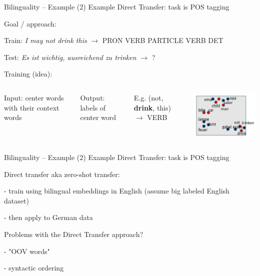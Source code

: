 \documentclass[12pt]{beamer}
\begin{document}
\begin{frame}{Bilinguality -- Example}
(2) Example Direct Transfer: task is POS tagging
	
Goal / approach: 

Train: \emph{I may not drink this} $\to$ PRON VERB PARTICLE VERB DET

Test: \emph{Es ist wichtig, ausreichend zu trinken} $\to$ ?



\begin{block}{Training (idea):}
	
	\begin{columns}
		\column{6cm}
		
		Input: center words with their context words

		Output: labels of center word
		
		E.g. (not, \textbf{drink}, this) $\to$ VERB
		
		\column{3cm}
		\includegraphics[width=\linewidth]{img/biling-2.png}
		
	\end{columns}
\end{block}

\end{frame}

\begin{frame}{Bilinguality -- Example}
(2) Example Direct Transfer: task is POS tagging

Direct transfer aka zero-shot transfer: 

- train using bilingual embeddings in English (assume big labeled English dataset) 

- then apply to German data

Problems with the Direct Transfer approach?

- "OOV words"

- syntactic ordering

	
\end{frame}
\end{document}
